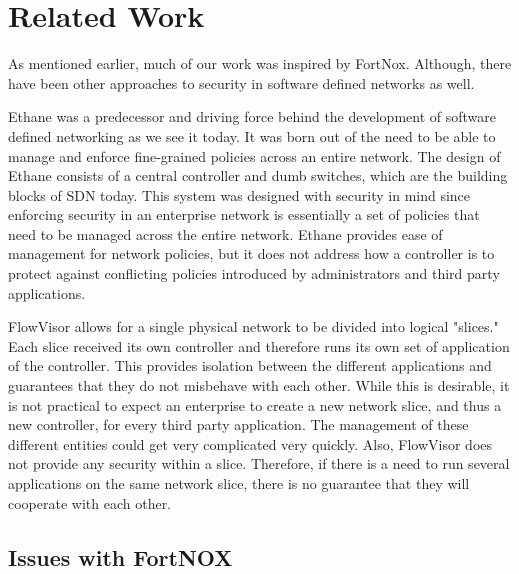 \section{Related Work}
\label{sec:related}

As mentioned earlier, much of our work was inspired by FortNox. Although, there have been other approaches to security in software defined networks as well.

Ethane \cite{Casado:2007:ETC:1282380.1282382} was a predecessor and driving force behind the development of software defined networking as we see it today.
It was born out of the need to be able to manage and enforce fine-grained policies across an entire network.
The design of Ethane consists of a central controller and dumb switches, which are the building blocks of SDN today.
This system was designed with security in mind since enforcing security in an enterprise network is essentially a set of policies that need to be managed across the entire network.
Ethane provides ease of management for network policies, but it does not address how a controller is to protect against conflicting policies introduced by administrators and third party applications.

FlowVisor \cite{flowvisor} allows for a single physical network to be divided into logical "slices."
Each slice received its own controller and therefore runs its own set of application of the controller.
This provides isolation between the different applications and guarantees that they do not misbehave with each other.
While this is desirable, it is not practical to expect an enterprise to create a new network slice, and thus a new controller, for every third party application.
The management of these different entities could get very complicated very quickly.
Also, FlowVisor does not provide any security within a slice.
Therefore, if there is a need to run several applications on the same network slice, there is no guarantee that they will cooperate with each other.


\subsection{Issues with FortNOX}
\label{sec:fortnox}

